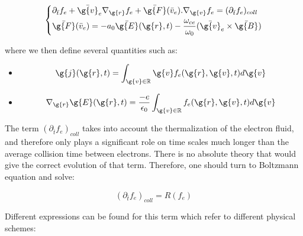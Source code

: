 \begin{equation}
  \left\{
      \begin{aligned}
     &\partial_{\bar{t}} f_e + \bar{\g{v}}_e \nabla_{\g{r}} f_e + \bar{\g{F}}(\bar{v}_e).\nabla_{\g{v}}f_e = (\partial_{\bar{t}}f_e)_{coll}\\
     & \bar{\g{F}}(\bar{v}_e) = -a_0\bar{\g{E}}(\g{r},t) - \frac{\omega_{ce}}{\omega_0}(\bar{\g{v}}_e \times \bar{\g{B}})\\
      \end{aligned}
    \right.
\end{equation}

\noindent where we then define several quantities such as:\\

\begin{itemize}
\item {}
$$\g{j}(\g{r},t) = \int_{\g{v}\in\mathbb{R}}\g{v}f_e(\g{r},\g{v},t)d\g{v}
$$
\item {}
$$
\nabla_{\g{r}} \g{E}(\g{r},t) = \frac{-e}{\epsilon_0}\int_{\g{v}\in\mathbb{R}}f_e(\g{r},\g{v},t)d\g{v}
$$
\end{itemize}




\noindent The term $(\partial_{\bar{t}}f_e)_{coll}$ takes into account the thermalization of the electron fluid, and therefore only plays a significant role on time scales much longer than the average collision time between electrons. There is no absolute theory that would give the correct evolution of that term. Therefore, one should turn to Boltzmann equation and solve: 

\begin{equation}
 (\partial_{\bar{t}}f_e)_{coll} = R(f_e)
\end{equation}

\noindent Different expressions can be found for this term which refer to different physical schemes:


